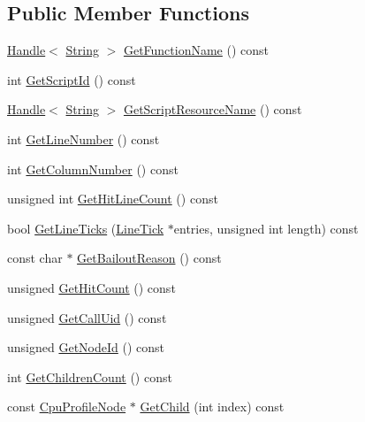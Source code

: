 \subsection*{Public Member Functions}
\begin{DoxyCompactItemize}
\item 
\hyperlink{classv8_1_1_handle}{Handle}$<$ \hyperlink{classv8_1_1_string}{String} $>$ \hyperlink{classv8_1_1_cpu_profile_node_affbc7842b66986012285602ab65aa5f8}{Get\+Function\+Name} () const 
\item 
int \hyperlink{classv8_1_1_cpu_profile_node_acf6f384df08ec40ff306d3e229f77258}{Get\+Script\+Id} () const 
\item 
\hyperlink{classv8_1_1_handle}{Handle}$<$ \hyperlink{classv8_1_1_string}{String} $>$ \hyperlink{classv8_1_1_cpu_profile_node_a140dd536e7096701a36be0083c18c268}{Get\+Script\+Resource\+Name} () const 
\item 
int \hyperlink{classv8_1_1_cpu_profile_node_a45ea035661c7152e4f3eb47f73787a75}{Get\+Line\+Number} () const 
\item 
int \hyperlink{classv8_1_1_cpu_profile_node_a43cf237ea6f254a61a6e2a81d554aa1a}{Get\+Column\+Number} () const 
\item 
unsigned int \hyperlink{classv8_1_1_cpu_profile_node_ac0d6015d3859e29db07f6a7e574426d3}{Get\+Hit\+Line\+Count} () const 
\item 
bool \hyperlink{classv8_1_1_cpu_profile_node_af31611e24f47519e82b52b49969ed0a4}{Get\+Line\+Ticks} (\hyperlink{structv8_1_1_cpu_profile_node_1_1_line_tick}{Line\+Tick} $\ast$entries, unsigned int length) const 
\item 
const char $\ast$ \hyperlink{classv8_1_1_cpu_profile_node_a16cd3d8d7ef307784838a35022507031}{Get\+Bailout\+Reason} () const 
\item 
unsigned \hyperlink{classv8_1_1_cpu_profile_node_a8d297f185b0bbd9f6853f6ed193b656e}{Get\+Hit\+Count} () const 
\item 
unsigned \hyperlink{classv8_1_1_cpu_profile_node_a245092eb223b948fc9441664d9e2701e}{Get\+Call\+Uid} () const 
\item 
unsigned \hyperlink{classv8_1_1_cpu_profile_node_ae2971c5003353a984ef72b6cddf5e298}{Get\+Node\+Id} () const 
\item 
int \hyperlink{classv8_1_1_cpu_profile_node_ac4612b91e43a2901ac20c3705288955b}{Get\+Children\+Count} () const 
\item 
const \hyperlink{classv8_1_1_cpu_profile_node}{Cpu\+Profile\+Node} $\ast$ \hyperlink{classv8_1_1_cpu_profile_node_aa397db1e0f5147155164c5ea3e854d69}{Get\+Child} (int index) const 
\end{DoxyCompactItemize}
